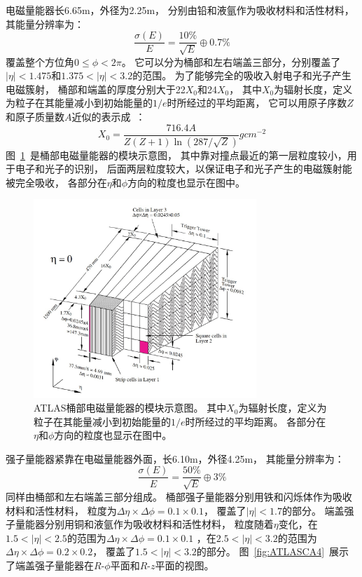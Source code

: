 电磁量能器长6.65m，外径为2.25m，
分别由铅和液氩作为吸收材料和活性材料，
其能量分辨率为：
\begin{equation} 
\label{eq:EMsigma1}
\frac{\sigma(E)}{E}=\frac{10\%}{\sqrt{E}}\oplus 0.7\%
\end{equation}
覆盖整个方位角$0\le\phi<2\pi$。
它可以分为桶部和左右端盖三部分，分别覆盖了$|\eta|<1.475$和$1.375<|\eta|<3.2$的范围。
为了能够完全的吸收入射电子和光子产生电磁簇射，
桶部和端盖的厚度分别大于22$X_0$和24$X_0$，
其中$X_0$为辐射长度，定义为粒子在其能量减小到初始能量的$1/e$时所经过的平均距离，
它可以用原子序数$Z$和原子质量数$A$近似的表示成~\cite{PDG}：
\begin{equation} 
\label{eq:X0def}
X_0=\frac{716.4A}{Z(Z+1)\ln(287/\sqrt{Z})}g cm^{-2}
\end{equation}
图~\ref{fig:ATLASCA3}~是桶部电磁量能器的模块示意图，
其中靠对撞点最近的第一层粒度较小，用于电子和光子的识别，
后面两层粒度较大，以保证电子和光子产生的电磁簇射能被完全吸收，
各部分在$\eta$和$\phi$方向的粒度也显示在图中。

\begin{figure}
  \begin{center}
    \includegraphics[width=0.75\textwidth]{figuresEXP/ATLASCA3.jpg}
  \end{center}
  \caption{
ATLAS桶部电磁量能器的模块示意图。
其中$X_0$为辐射长度，定义为粒子在其能量减小到初始能量的$1/e$时所经过的平均距离。
各部分在$\eta$和$\phi$方向的粒度也显示在图中。
  }
    \label{fig:ATLASCA3}
\end{figure}

强子量能器紧靠在电磁量能器外面，长6.10m，外径4.25m，
其能量分辨率为：
\begin{equation} 
\label{eq:EMsigma2}
\frac{\sigma(E)}{E}=\frac{50\%}{\sqrt{E}}\oplus 3\%
\end{equation}
同样由桶部和左右端盖三部分组成。
桶部强子量能器分别用铁和闪烁体作为吸收材料和活性材料，
粒度为$\Delta\eta\times\Delta\phi=0.1\times0.1$，
覆盖了$|\eta|<1.7$的部分。
端盖强子量能器分别用铜和液氩作为吸收材料和活性材料，
粒度随着$\eta$变化，在$1.5<|\eta|<2.5$的范围为$\Delta\eta\times\Delta\phi=0.1\times0.1$
，在$2.5<|\eta|<3.2$的范围为$\Delta\eta\times\Delta\phi=0.2\times0.2$，
覆盖了$1.5<|\eta|<3.2$的部分。
图~\ref{fig:ATLASCA4}~展示了端盖强子量能器在$R$-$\phi$平面和$R$-$z$平面的视图。

